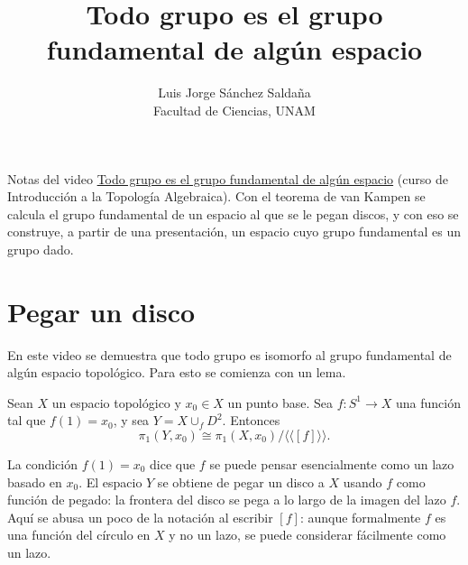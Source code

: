 \documentclass[11pt]{article}
\title{Todo grupo es el grupo fundamental de algún espacio}
\author{Luis Jorge Sánchez Saldaña\\[2pt]\small Facultad de Ciencias, UNAM}
\date{}
\begin{document}
\maketitle

\noindent\small Notas del video
\href{https://www.youtube.com/watch?v=VTzBXDAMEn0}{\guillemotleft{}Todo grupo es el grupo fundamental de algún espacio\guillemotright{}}
(curso de Introducción a la Topología Algebraica). Con el teorema de van Kampen se calcula el grupo fundamental de un espacio al que se le pegan discos, y con eso se construye, a partir de una presentación, un espacio cuyo grupo fundamental es un grupo dado.
\normalsize

\section*{Pegar un disco}

En este video se demuestra que todo grupo es isomorfo al grupo fundamental de algún espacio topológico. Para esto se comienza con un lema.

\begin{lema}\label{lema:un-disco}
Sean $X$ un espacio topológico y $x_0\in X$ un punto base. Sea $f\colon S^1\to X$ una función tal que $f(1)=x_0$, y sea $Y=X\cup_f D^2$. Entonces
\[
  \pi_1(Y,x_0)\cong\pi_1(X,x_0)\big/\langle\!\langle[f]\rangle\!\rangle.
\]
\end{lema}

La condición $f(1)=x_0$ dice que $f$ se puede pensar esencialmente como un lazo basado en $x_0$. El espacio $Y$ se obtiene de pegar un disco a $X$ usando $f$ como función de pegado: la frontera del disco se pega a lo largo de la imagen del lazo $f$. Aquí se abusa un poco de la notación al escribir $[f]$: aunque formalmente $f$ es una función del círculo en $X$ y no un lazo, se puede considerar fácilmente como un lazo.

\begin{center}
\end{center}
\end{document}
